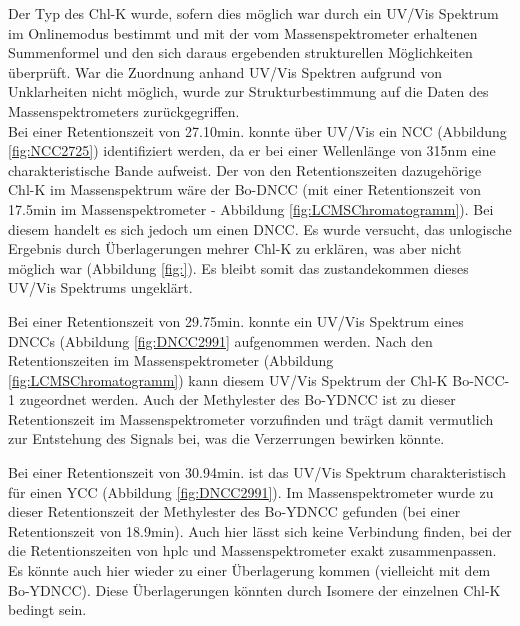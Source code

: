 Der Typ des \gls{Chl-K} wurde, sofern dies möglich war durch ein UV/Vis Spektrum im Onlinemodus bestimmt und mit der vom Massenspektrometer erhaltenen Summenformel und den sich daraus ergebenden strukturellen Möglichkeiten überprüft. War die Zuordnung anhand UV/Vis Spektren aufgrund von Unklarheiten nicht möglich, wurde zur Strukturbestimmung auf die Daten des Massenspektrometers zurückgegriffen.\\

Bei einer Retentionszeit von 27.10min. konnte über UV/Vis ein \gls{NCC} (Abbildung \ref{fig:NCC2725}) identifiziert werden, da er bei einer Wellenlänge von 315nm eine charakteristische Bande aufweist. Der von den Retentionszeiten dazugehörige \gls{Chl-K} im Massenspektrum wäre der Bo-DNCC (mit einer Retentionszeit von 17.5min im Massenspektrometer - Abbildung \ref{fig:LCMSChromatogramm}). Bei diesem handelt es sich jedoch um einen \gls{DNCC}. Es wurde versucht, das unlogische Ergebnis durch Überlagerungen mehrer \gls{Chl-K} zu erklären, was aber nicht möglich war (Abbildung \ref{fig:}). Es bleibt somit das zustandekommen dieses UV/Vis Spektrums ungeklärt. 

Bei einer Retentionszeit von 29.75min. konnte ein UV/Vis Spektrum eines \gls{DNCC}s (Abbildung \ref{fig:DNCC2991} aufgenommen werden. Nach den Retentionszeiten im Massenspektrometer (Abbildung \ref{fig:LCMSChromatogramm}) kann diesem UV/Vis Spektrum der \gls{Chl-K} Bo-NCC-1 zugeordnet werden. Auch der Methylester des Bo-YDNCC ist zu dieser Retentionszeit im Massenspektrometer vorzufinden und trägt damit vermutlich zur Entstehung des Signals bei, was die Verzerrungen bewirken könnte.

Bei einer Retentionszeit von 30.94min. ist das UV/Vis Spektrum charakteristisch für einen \gls{YCC} (Abbildung \ref{fig:DNCC2991}). Im Massenspektrometer wurde zu dieser Retentionszeit der Methylester des Bo-YDNCC gefunden (bei einer Retentionszeit von 18.9min). Auch hier lässt sich keine Verbindung finden, bei der die Retentionszeiten von \gls{hplc} und Massenspektrometer exakt zusammenpassen. Es könnte auch hier wieder zu einer Überlagerung kommen (vielleicht mit dem Bo-YDNCC). Diese Überlagerungen könnten durch Isomere der einzelnen \gls{Chl-K} bedingt sein. \\

